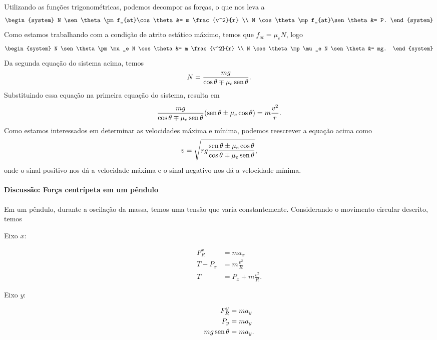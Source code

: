 Utilizando as funções trigonométricas, podemos decompor as forças, o que nos leva a
\begin{equation}
\begin{system}
    N \sen\theta \pm f_{at}\cos\theta &= m \frac{v^2}{r} \\
    N \cos\theta \mp f_{at}\sen\theta &= P.
\end{system}
\end{equation}
%
Como estamos trabalhando com a condição de atrito estático máximo, temos que $f_{at} = \mu_e N$, logo
\begin{equation}
\begin{system}
    N \sen\theta \pm \mu_e N \cos\theta &= m \frac{v^2}{r} \\
    N \cos\theta \mp \mu_e N \sen\theta &= mg.
\end{system}
\end{equation}
%
Da segunda equação do sistema acima, temos
\begin{equation}
    N = \frac{mg}{\cos\theta \mp \mu_e\operatorname{sen}\theta}.
\end{equation}
%
Substituindo essa equação na primeira equação do sistema, resulta em
\begin{equation}
    \frac{mg}{\cos\theta \mp \mu_e\operatorname{sen}\theta} (\operatorname{sen}\theta \pm \mu_e \cos\theta) = m\frac{v^2}{r}.
\end{equation}
%
Como estamos interessados em determinar as velocidades máxima e mínima, podemos reescrever a equação acima como
\begin{equation}
    v = \sqrt{rg \frac{\operatorname{sen}\theta \pm \mu_e \cos\theta}{\cos\theta \mp \mu_e\operatorname{sen}\theta}},
\end{equation}
%
onde o sinal positivo nos dá a velocidade máxima e o sinal negativo nos dá a velocidade mínima.

\paragraph{Discussão: Força centrípeta em um pêndulo}

Em um pêndulo, durante a oscilação da massa, temos uma tensão que varia constantemente. Considerando o movimento circular descrito, temos
\begin{description}
    \item[Eixo $x$:]
        \begin{align}
            F_R^x &= m a_x \\
            T - P_x &= m \frac{v^2}{R} \\
            T &= P_x + m\frac{v^2}{R}.
        \end{align}
    \item[Eixo $y$:]
        \begin{align}
            F_R^y &= m a_y \\
            P_y &= m a_y \\
            mg \operatorname{sen}\theta &= m a_y.
        \end{align}
\end{description}

